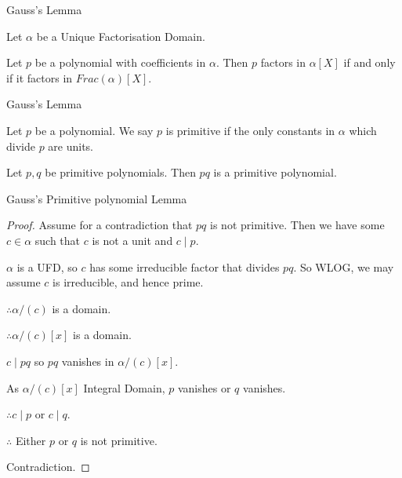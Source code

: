 \documentclass{beamer}
\begin{document}
\begin{frame}{Gauss's Lemma}
  \begin{theorem}
    Let $\alpha$ be a Unique Factorisation Domain. 

    Let $p$ be a polynomial with coefficients in $\alpha$. Then $p$ factors in $\alpha[X]$ if and only if it factors in $Frac(\alpha)[X]$.
  \end{theorem}
\end{frame} 

\begin{frame}{Gauss's Lemma}
  \begin{definition}
    Let $p$ be a polynomial. We say $p$ is primitive if the only constants in $ \alpha $ which divide $p$ are units. 
  \end{definition}

  \begin{lemma}
    Let $p,q$ be primitive polynomials. Then $pq$ is a primitive polynomial.
  \end{lemma}

\end{frame}

\begin{frame}{Gauss's Primitive polynomial Lemma}
  \begin{proof}
    Assume for a contradiction that $pq$ is not primitive. 
    Then we have some $c \in \alpha$ such that $c$ is not a unit and $c \mid p$. 
   
    $\alpha$ is a UFD, so $c$ has some irreducible factor that divides $pq$. So WLOG, we may assume $c$ is irreducible, and hence prime.

    $\therefore \alpha/(c)$ is a domain.
    
    $\therefore \alpha/(c) [x]$ is a domain. 

    $c \mid pq$ so $pq$ vanishes in $\alpha/(c) [x]$. 

    As $\alpha/(c) [x]$ Integral Domain, $p$ vanishes or $q$ vanishes.

   $\therefore c \mid p$ or $c \mid q$. 
    
   $\therefore$ Either $p$ or $q$ is not primitive. 

   Contradiction.
  \end{proof}

\end{frame}
\end{document}
